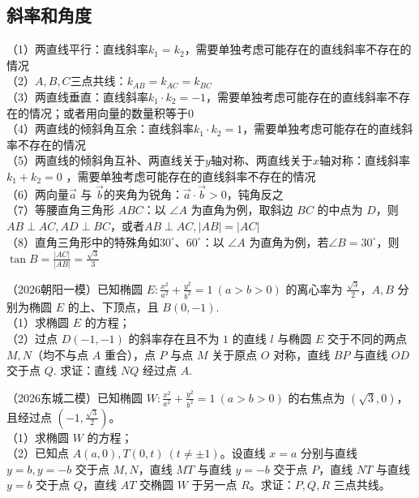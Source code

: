 \subsection{斜率和角度}
\noindent（1）两直线平行：直线斜率$k_1 = k_2$，需要单独考虑可能存在的直线斜率不存在的情况 \\
（2）$A, B, C$三点共线：$k_{AB} = k_{AC} = k_{BC}$ \\
（3）两直线垂直：直线斜率$k_1 \cdot k_2 = -1$，需要单独考虑可能存在的直线斜率不存在的情况；或者用向量的数量积等于0 \\
（4）两直线的倾斜角互余：直线斜率$k_1 \cdot k_2 = 1$，需要单独考虑可能存在的直线斜率不存在的情况 \\
（5）两直线的倾斜角互补、两直线关于$y$轴对称、两直线关于$x$轴对称：直线斜率$k_1 + k_2 = 0$ ，需要单独考虑可能存在的直线斜率不存在的情况\\
（6）两向量$\overrightarrow{a}$ 与 $\overrightarrow{b}$的夹角为锐角：$\overrightarrow{a}\cdot\overrightarrow{b}>0$，钝角反之\\
（7）等腰直角三角形 $ABC$：以 $\angle A$ 为直角为例，取斜边 $BC$ 的中点为 $D$，则$AB\perp AC,AD \perp BC$，或者$AB \perp AC, \vert AB \vert  = \vert AC \vert$\\
（8）直角三角形中的特殊角如$30^\circ$、$60^\circ$：以 $\angle A$ 为直角为例，若$\angle B = 30^\circ$，则$\tan B = \frac{\vert AC \vert }{\vert AB \vert}= \frac{\sqrt{3}}{3}$ \\


\begin{example} %
（2026朝阳一模）已知椭圆 $E:\frac{x^2}{a^2}+\frac{y^2}{b^2}=1\ (a>b>0)$ 的离心率为 $\frac{\sqrt{3}}{2}$，$A,B$ 分别为椭圆 $E$ 的上、下顶点，且 $B(0,-1)$.\\
（1）求椭圆 $E$ 的方程；\\
（2）过点 $D(-1,-1)$ 的斜率存在且不为 $1$ 的直线 $l$ 与椭圆 $E$ 交于不同的两点 $M,N$（均不与点 $A$ 重合），点 $P$ 与点 $M$ 关于原点 $O$ 对称，直线 $BP$ 与直线 $OD$ 交于点 $Q$. 求证：直线 $NQ$ 经过点 $A$.
\end{example}

\begin{example} %
（2026东城二模）已知椭圆 $W:\frac{x^2}{a^2}+\frac{y^2}{b^2}=1\ (a>b>0)$ 的右焦点为 $(\sqrt{3},0)$，且经过点 $\left(-1,\frac{\sqrt{3}}{2}\right)$。\\
（1）求椭圆 $W$ 的方程；\\
（2）已知点 $A(a,0),T(0,t)\ (t\neq\pm1)$。设直线 $x=a$ 分别与直线 $y=b,y=-b$ 交于点 $M,N$，直线 $MT$ 与直线 $y=-b$ 交于点 $P$，直线 $NT$ 与直线 $y=b$ 交于点 $Q$，直线 $AT$ 交椭圆 $W$ 于另一点 $R$。求证：$P,Q,R$ 三点共线。
\end{example}

